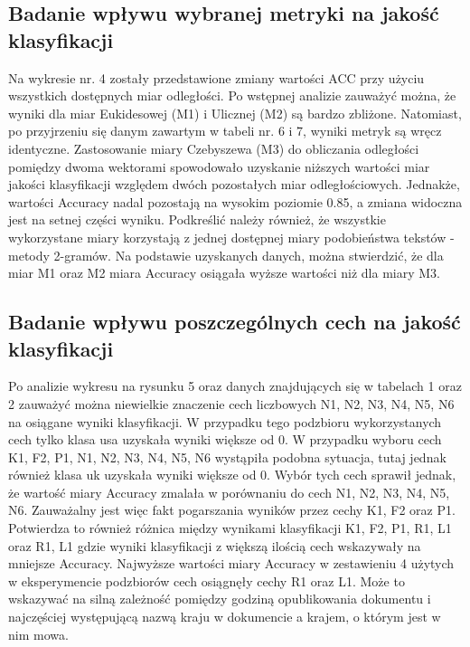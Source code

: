 \documentclass{classrep}
\begin{document}
\subsection{Badanie wpływu wybranej metryki na jakość klasyfikacji}
Na wykresie nr. 4 zostały przedstawione zmiany wartości ACC przy użyciu wszystkich dostępnych miar odległości. Po wstępnej analizie zauważyć można, że wyniki dla miar Eukidesowej (M1) i Ulicznej (M2) są bardzo zbliżone. Natomiast, po przyjrzeniu się danym zawartym w tabeli nr. 6 i 7, wyniki metryk są wręcz identyczne. Zastosowanie miary Czebyszewa (M3) do obliczania odległości pomiędzy dwoma wektorami spowodowało uzyskanie niższych wartości miar jakości klasyfikacji względem dwóch pozostałych miar odległościowych. Jednakże, wartości Accuracy nadal pozostają na wysokim poziomie 0.85, a zmiana widoczna jest na setnej części wyniku. Podkreślić należy również, że wszystkie wykorzystane miary korzystają z jednej dostępnej miary podobieństwa tekstów - metody 2-gramów.  Na podstawie uzyskanych danych, można stwierdzić, że dla miar M1 oraz M2 miara Accuracy osiągała wyższe wartości niż dla miary M3.  
\\
\subsection{Badanie wpływu poszczególnych cech na jakość klasyfikacji}
Po analizie wykresu na rysunku 5 oraz danych znajdujących się w tabelach 1 oraz 2 zauważyć można niewielkie znaczenie cech liczbowych N1, N2, N3, N4, N5, N6 na osiągane wyniki klasyfikacji. W przypadku tego podzbioru wykorzystanych cech tylko klasa usa uzyskała wyniki większe od 0. W przypadku wyboru cech K1, F2, P1, N1, N2, N3, N4, N5, N6 wystąpiła podobna sytuacja, tutaj jednak również klasa uk uzyskała wyniki większe od 0. Wybór tych cech sprawił jednak, że wartość miary Accuracy zmalała w porównaniu do cech N1, N2, N3, N4, N5, N6. Zauważalny jest więc fakt pogarszania wyników przez cechy K1, F2 oraz P1. Potwierdza to również różnica między wynikami klasyfikacji K1, F2, P1, R1, L1 oraz R1, L1 gdzie wyniki klasyfikacji z większą ilością cech wskazywały na mniejsze Accuracy. Najwyższe wartości miary Accuracy w zestawieniu 4 użytych w eksperymencie podzbiorów cech osiągnęły cechy R1 oraz L1. Może to wskazywać na silną zależność pomiędzy godziną opublikowania dokumentu i najczęściej występującą nazwą kraju w dokumencie a krajem, o którym jest w nim mowa.
\end{document}

